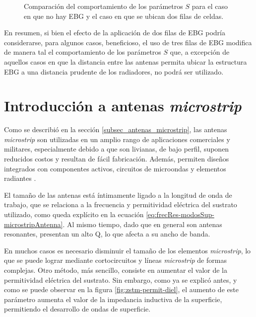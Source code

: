 \begin{figure}[H]
	\centering 
	\hspace{0pt}
	\caption{Comparación del comportamiento de los parámetros $S$ para el caso en que no hay EBG y el caso en que se ubican dos filas de celdas.}
	\label{fig:comparacion-23filas-ebg-mo}
\end{figure}

En resumen, si bien el efecto de la aplicación de dos filas de EBG podría considerarse, para algunos casos, beneficioso, el uso de tres filas de EBG modifica de manera tal el comportamiento de los parámetros $S$ que, a excepción de aquellos casos en que la distancia entre las antenas permita ubicar la estructura EBG a una distancia prudente de los radiadores, no podrá ser utilizado.

	
\section{Introducción a antenas \textit{microstrip}}

Como se describió en la sección \ref{subsec_antenas_microstrip}, las antenas \textit{microstrip} son utilizadas en un amplio rango de aplicaciones comerciales y militares, especialmente debido a que son livianas, de bajo perfil, suponen reducidos costos y resultan de fácil fabricación. Además, permiten diseños integrados con componentes activos, circuitos de microondas y elementos radiantes \cite{Yang:EBGAntennas}.

El tamaño de las antenas está íntimamente ligado a la longitud de onda de trabajo, que se relaciona a la frecuencia y permitividad eléctrica del sustrato utilizado, como queda explícito en la ecuación \ref{eq:frecRes-modosSup-microstripAntenna}. Al mismo tiempo, dado que en general son antenas resonantes, presentan un alto Q, lo que afecta a su ancho de banda.

En muchos casos es necesario disminuir el tamaño de los elementos \textit{microstrip}, lo que se puede lograr mediante cortocircuitos y líneas \textit{microstrip} de formas complejas. Otro método, más sencillo, consiste en aumentar el valor de la permitividad eléctrica del sustrato. Sin embargo, como ya se explicó antes, y como se puede observar en la figura \ref{fig:zstm-permit-diel}, el aumento de este parámetro aumenta el valor de la impedancia inductiva de la superficie, permitiendo el desarrollo de ondas de superficie.

